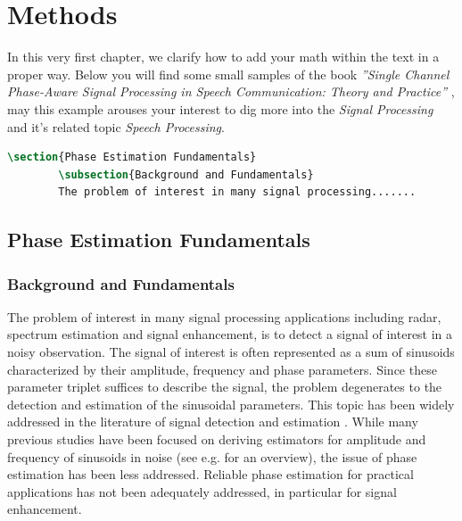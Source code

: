 

\chapter{Methods}\label{ch:Methods}
In this very first chapter, we clarify how to add your math within the text in a proper way. Below you will find some small samples of the book \emph{''Single Channel Phase-Aware Signal Processing in Speech Communication: Theory and Practice''} \cite{MowlaeePejman2016}, may this example arouses your interest to dig more into the \emph{Signal Processing} and it's related topic \emph{Speech Processing}.

\begin{mdframed}
	\begin{lstlisting}[language = TeX, caption={Adding section and subsection}]
		\section{Phase Estimation Fundamentals}
		\subsection{Background and Fundamentals}
		The problem of interest in many signal processing.......	
	\end{lstlisting}
\end{mdframed}

\section{Phase Estimation Fundamentals}\label{sec:PEF}
\subsection{Background and Fundamentals}
The problem of interest in many signal processing applications including radar, spectrum estimation and signal enhancement, is to detect a signal of interest in a noisy observation. The signal of interest is often represented as a sum of sinusoids characterized by their amplitude, frequency and phase parameters. Since these parameter triplet suffices to describe the signal, the problem degenerates to the detection and estimation of the sinusoidal parameters. This topic has been widely addressed in the literature of signal detection \cite{VanTrees1968} and estimation \cite{Kay1993}. While many previous studies have been focused on deriving estimators for amplitude and frequency of sinusoids in noise (see e.g. \cite{Stoica2005} for an overview), the issue of phase estimation has been less addressed. Reliable phase estimation for practical applications has not been adequately addressed, in particular for signal enhancement.

